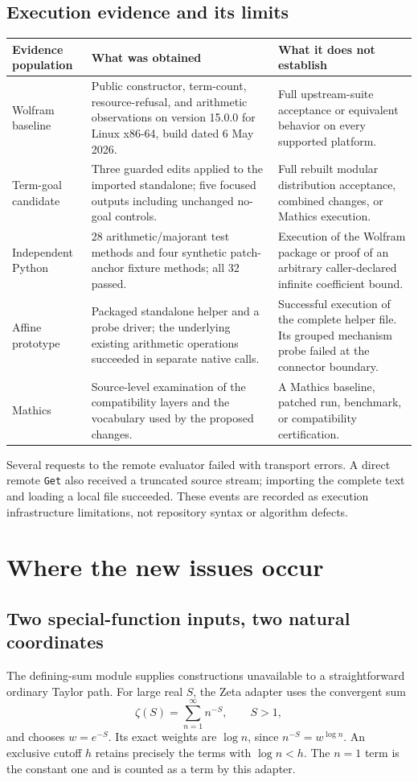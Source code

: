 \documentclass[11pt,letterpaper]{article}
\newcommand{\code}[1]{\nolinkurl{#1}}
\begin{document}
\subsection{Execution evidence and its limits}
\begin{longtable}{@{}P{0.25\textwidth}P{0.39\textwidth}P{0.29\textwidth}@{}}
\toprule
Evidence population & What was obtained & What it does not establish\\\midrule\endhead
Wolfram baseline & Public constructor, term-count, resource-refusal, and arithmetic observations on version 15.0.0 for Linux x86-64, build dated 6 May 2026. & Full upstream-suite acceptance or equivalent behavior on every supported platform.\\
Term-goal candidate & Three guarded edits applied to the imported standalone; five focused outputs including unchanged no-goal controls. & Full rebuilt modular distribution acceptance, combined changes, or Mathics execution.\\
Independent Python & 28 arithmetic/majorant test methods and four synthetic patch-anchor fixture methods; all 32 passed. & Execution of the Wolfram package or proof of an arbitrary caller-declared infinite coefficient bound.\\
Affine prototype & Packaged standalone helper and a probe driver; the underlying existing arithmetic operations succeeded in separate native calls. & Successful execution of the complete helper file. Its grouped mechanism probe failed at the connector boundary.\\
Mathics & Source-level examination of the compatibility layers and the vocabulary used by the proposed changes. & A Mathics baseline, patched run, benchmark, or compatibility certification.\\
\bottomrule
\end{longtable}

Several requests to the remote evaluator failed with transport errors. A direct
remote \code{Get} also received a truncated source stream; importing the complete
text and loading a local file succeeded. These events are recorded as execution
infrastructure limitations, not repository syntax or algorithm defects.

\section{Where the new issues occur}
\subsection{Two special-function inputs, two natural coordinates}
The defining-sum module supplies constructions unavailable to a straightforward
ordinary Taylor path. For large real $S$, the Zeta adapter uses the convergent
sum
\begin{equation}
 \zeta(S)=\sum_{n=1}^{\infty} n^{-S},\qquad S>1,
\end{equation}
and chooses $w=e^{-S}$. Its exact weights are $\log n$, since
$n^{-S}=w^{\log n}$. An exclusive cutoff $h$ retains precisely the terms with
$\log n<h$. The $n=1$ term is the constant one and is counted as a term by this
adapter.~\cite{dirichlet,dlmf-zeta}
\end{document}
